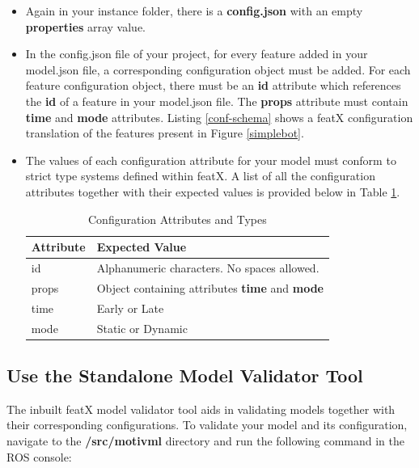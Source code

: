 \documentclass{article}
\begin{document}
\begin{itemize}
	\item Again in your instance folder, there is a \textbf{config.json} with an empty \textbf{properties} array value.
	
	\item In the config.json file of your project, for every feature added in your model.json file, a corresponding configuration object must be added. For each feature configuration object, there must be an \textbf{id} attribute which references the \textbf{id} of a feature in your model.json file. The \textbf{props} attribute must contain \textbf{time} and \textbf{mode} attributes.  Listing \ref{conf-schema} shows a featX configuration translation of the features present in Figure \ref{simplebot}.
	
	\item The values of each configuration attribute for your model must conform to strict type systems defined within featX. A list of all the configuration attributes together with their expected values is provided below in Table \ref{tab:confvalueTypes}.
	
	\begin{table}[H]
		\centering
		\caption{Configuration Attributes and Types}
		\begin{tabular}{l|p{7cm}}
			\hline
			Attribute & Expected Value \\\hline
			id & Alphanumeric characters. No spaces allowed.   \\ \hline
			props & Object containing attributes \textbf{time} and \textbf{mode} \\ \hline
			time & Early or Late  \\ \hline
			mode & Static or Dynamic \\ 
		\end{tabular}
		\label{tab:confvalueTypes}
	\end{table}
	
\end{itemize}

\subsection{Use the Standalone Model Validator Tool}
The inbuilt featX model validator tool aids in validating models together with their corresponding configurations. To validate your model and its configuration, navigate to the \textbf{/src/motivml} directory and run the following command in the ROS console:
\end{document}
